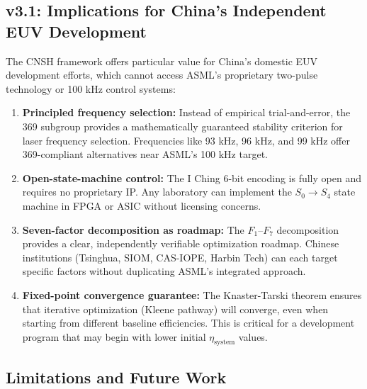 \documentclass[twocolumn]{article}
\begin{document}
\subsection{v3.1: Implications for China's Independent EUV Development}

The CNSH framework offers particular value for China's domestic EUV development efforts, which cannot access ASML's proprietary two-pulse technology or 100 kHz control systems:

\begin{enumerate}
  \item \textbf{Principled frequency selection:} Instead of empirical trial-and-error, the 369 subgroup provides a mathematically guaranteed stability criterion for laser frequency selection. Frequencies like 93 kHz, 96 kHz, and 99 kHz offer 369-compliant alternatives near ASML's 100 kHz target.
  \item \textbf{Open-state-machine control:} The I Ching 6-bit encoding is fully open and requires no proprietary IP. Any laboratory can implement the $S_0 \to S_4$ state machine in FPGA or ASIC without licensing concerns.
  \item \textbf{Seven-factor decomposition as roadmap:} The $F_1$–$F_7$ decomposition provides a clear, independently verifiable optimization roadmap. Chinese institutions (Tsinghua, SIOM, CAS-IOPE, Harbin Tech) can each target specific factors without duplicating ASML's integrated approach.
  \item \textbf{Fixed-point convergence guarantee:} The Knaster-Tarski theorem ensures that iterative optimization (Kleene pathway) will converge, even when starting from different baseline efficiencies. This is critical for a development program that may begin with lower initial $\eta_{\text{system}}$ values.
\end{enumerate}

\subsection{Limitations and Future Work}
\end{document}
